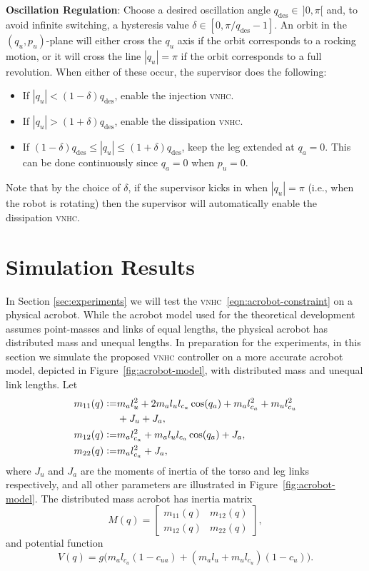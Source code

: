 \documentclass[journal,twoside,web, twocolumn]{ieeecolor}
\newcommand*{\eqdef}{\vcentcolon=}
\newcommand*{\vnhc}{\textsc{vnhc}\xspace}
\begin{document}
\textbf{Oscillation Regulation}: Choose a desired oscillation angle  \(q_\text{des} \in \, ]0,\pi[\) and, to avoid infinite switching, a hysteresis value \(\delta \in [0,\pi/q_\text{des} - 1]\). An orbit in the \((q_u,p_u)\)-plane will either cross the \(q_u\) axis if the orbit corresponds to a rocking motion, or it will cross the line \(|q_u| = \pi\) if the orbit corresponds to a full revolution. When either of these occur, the supervisor does the following: 
\begin{itemize}
    \item If \(|q_u| < (1-\delta)q_\text{des}\), enable the injection \vnhc.
    \item If \(|q_u| > (1+\delta)q_\text{des}\), enable the dissipation \vnhc.
    \item If \((1-\delta)q_\text{des} \leq |q_u| \leq (1+\delta)q_\text{des}\),
        keep the leg extended at \(q_a = 0\). This can be done continuously since
        \(q_a = 0\) when \(p_u = 0\).
\end{itemize}
Note that by the choice of \(\delta\), if the supervisor kicks in when  \(|q_u| = \pi\) (i.e., when the robot is rotating) then the supervisor will automatically enable the dissipation \vnhc.


\section{Simulation Results}\label{sec:simulations}
In Section \ref{sec:experiments} we will test the \vnhc~\eqref{eqn:acrobot-constraint} on a physical acrobot. While the acrobot model used for the theoretical development assumes point-masses and links of equal lengths, the physical acrobot has distributed mass and unequal lengths. In preparation for the experiments, in this section we simulate the proposed \vnhc controller on a more accurate acrobot model, depicted in Figure~\ref{fig:acrobot-model}, with distributed mass and unequal link lengths. Let
\begin{align*}
    m_{11}(q) \eqdef &m_a l_u^2 + 2m_al_ul_{c_a}\cos(q_a) + m_al_{c_a}^2 +
    m_ul_{c_u}^2 \\
                 &+ J_u + J_a
                 , \\
    m_{12}(q) \eqdef &m_al_{c_a}^2 + m_al_ul_{c_a}\cos(q_a) + J_a
    , \\
    m_{22}(q) \eqdef &m_al_{c_a}^2 + J_a,
\end{align*}
where \(J_u\) and \(J_a\) are the moments of inertia of the torso and leg links
respectively, and all other parameters are illustrated in Figure~\ref{fig:acrobot-model}. The distributed mass acrobot has inertia matrix
\begin{equation*}
    M(q) = \begin{bmatrix}
        m_{11}(q) & m_{12}(q) \\
        m_{12}(q) & m_{22}(q)
    \end{bmatrix}
    ,
\end{equation*}
and potential function
\begin{equation*}
    V(q) = g\big(m_al_{c_a}(1-c_{ua})
    + (m_al_u + m_ul_{c_u})(1-c_u)\big)
    .
\end{equation*}
\end{document}
